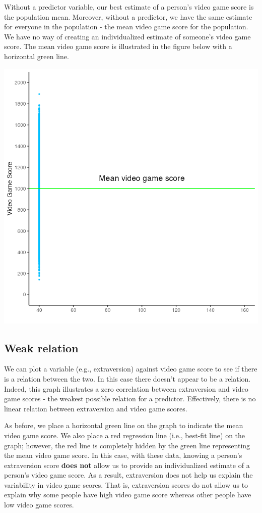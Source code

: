 \documentclass[
]{krantz}
\begin{document}
Without a predictor variable, our best estimate of a person's video game score is the population mean. Moreover, without a predictor, we have the same estimate for everyone in the population - the mean video game score for the population. We have no way of creating an individualized estimate of someone's video game score. The mean video game score is illustrated in the figure below with a horizontal green line.

\includegraphics[width=0.7\linewidth]{ch_correlation/images/pop_graph_mean}

\hypertarget{weak-relation}{%
\subsection{Weak relation}\label{weak-relation}}

We can plot a variable (e.g., extraversion) against video game score to see if there is a relation between the two. In this case there doesn't appear to be a relation. Indeed, this graph illustrates a zero correlation between extraversion and video game scores - the weakest possible relation for a predictor. Effectively, there is no linear relation between extraversion and video game scores.

As before, we place a horizontal green line on the graph to indicate the mean video game score. We also place a red regression line (i.e., best-fit line) on the graph; however, the red line is completely hidden by the green line representing the mean video game score. In this case, with these data, knowing a person's extraversion score \textbf{does not} allow us to provide an individualized estimate of a person's video game score. As a result, extraversion does not help us explain the variability in video game scores. That is, extraversion scores do not allow us to explain why some people have high video game score whereas other people have low video game scores.
\end{document}
